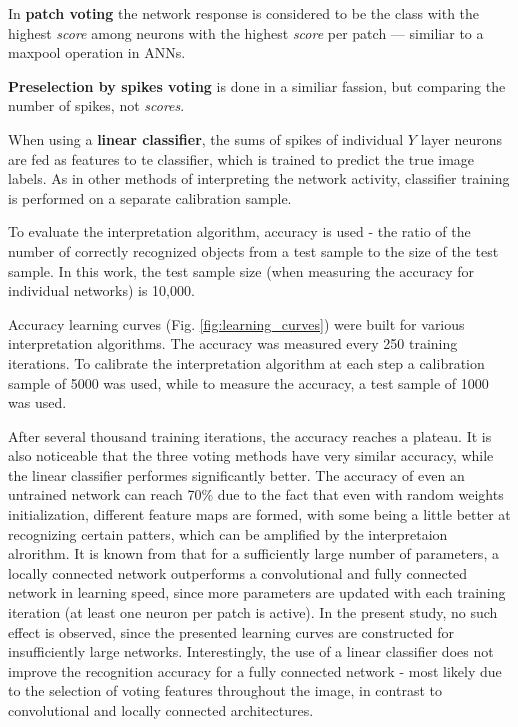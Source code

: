 \documentclass[a4paper]{article}
\begin{document}
In \textbf{patch voting} the network response is considered to be the class with the highest \textit{score} among neurons with the highest \textit{score} per patch --- similiar to a maxpool operation in ANNs.

\textbf{Preselection by spikes voting} is done in a similiar fassion, but comparing the number of spikes, not \textit{scores}.

When using a \textbf{linear classifier}, the sums of spikes of individual  $ Y $ layer neurons are fed as features to te classifier, which is trained to predict the true image labels. As in other methods of interpreting the network activity, classifier training is performed on a separate calibration sample.

To evaluate the interpretation algorithm, accuracy is used - the ratio of the number of correctly recognized objects from a test sample to the size of the test sample. In this work, the test sample size (when measuring the accuracy for individual networks) is 10,000.

Accuracy learning curves (Fig. \ref{fig:learning_curves}) were built for various interpretation algorithms. The accuracy was measured every 250 training iterations. To calibrate the interpretation algorithm at each step a calibration sample of 5000 was used, while to measure the accuracy, a test sample of 1000 was used.

After several thousand training iterations, the accuracy reaches a plateau. It is also noticeable that the three voting methods have very similar accuracy, while the linear classifier performes significantly better. The accuracy of even an untrained network can reach 70\% due to the fact that even with random weights initialization, different feature maps are formed, with some being a little better at recognizing certain patters, which can be amplified by the interpretaion alrorithm. It is known from \cite{saunders2019locally} that for a sufficiently large number of parameters, a locally connected network outperforms a convolutional and fully connected network in learning speed, since more parameters are updated with each training iteration (at least one neuron per patch is active). In the present study, no such effect is observed, since the presented learning curves are constructed for insufficiently large networks. Interestingly, the use of a linear classifier does not improve the recognition accuracy for a fully connected network - most likely due to the selection of voting features throughout the image, in contrast to convolutional and locally connected architectures.
\end{document}
